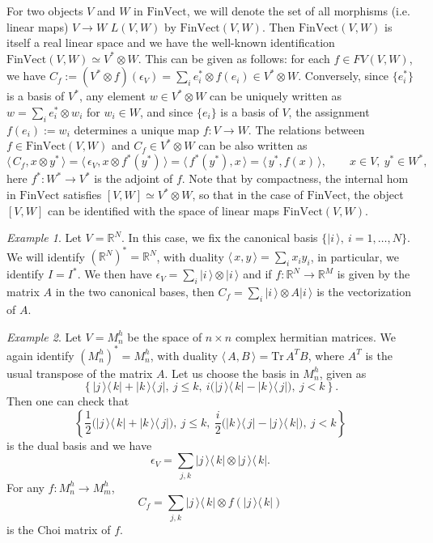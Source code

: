 \documentclass[12pt]{article}
\theoremstyle{definition}
\theoremstyle{remark}
\newtheorem{exm}{Example}
\def \Tr{\mathrm{Tr}\,}
\def\<{\langle\,}
\def\>{\,\rangle}
\def \FV{\mathrm{FinVect}}
\begin{document}
For two objects $V$ and $W$ in $\FV$, we will denote the set of all morphisms (i.e. linear
maps) $V\to
W$ $L(V,W)$  by $\FV(V,W)$. Then $\FV(V,W)$ is itself a real linear space and  we have the well-known identification 
$\FV(V,W)\simeq V^*\otimes W$. This can be given as follows: for each $f\in FV(V,W)$, we have 
$C_f:=(V^*\otimes f)(\epsilon_V)=\sum_i e_i^*\otimes f(e_i)\in V^*\otimes W$. Conversely,
since $\{e_i^*\}$ is a basis of $V^*$, 
any element $w\in V^*\otimes W$ can be uniquely written as $w=\sum_i e_i^*\otimes w_i$ for
$w_i\in W$, and since $\{e_i\}$ is a basis of $V$, the assignment $f(e_i):=w_i$ determines a
unique map $f:V\to W$. The relations between $f\in \FV(V,W)$ and $C_f\in V^*\otimes W$ can
be also written as
\[
\<C_f,x\otimes y^*\>=\<\epsilon_V,x\otimes f^*(y^*)\>=\<f^*(y^*),x\>=\<y^*,f(x)\>,\qquad x\in
V,\ y^*\in W^*,
\]
here $f^*:W^*\to V^*$ is the adjoint of $f$.
Note that by compactness, the internal hom in $\FV$ satisfies $[V,W]\simeq V^*\otimes W$,
so that  in the case of $\FV$, the object $[V,W]$ can be identified with the space of linear
maps $\FV(V,W)$. 


\begin{exm}\label{exm:classical} Let $V=\mathbb R^N$. In this case, we fix the canonical basis $\{|i\>,\
i=1,\dots,N\}$. We will identify $(\mathbb R^N)^*=\mathbb R^N$, with duality
$\<x,y\>=\sum_i x_iy_i$, in particular, we identify $I=I^*$. We then have
$\epsilon_V=\sum_i |i\>\otimes |i\>$ and if $f:\mathbb R^N\to \mathbb R^M$ is given by the
matrix $A$ in the two canonical bases, then  $C_f=\sum_i |i\>\otimes A|i\>$ is the
vectorization of $A$.

\end{exm}


\begin{exm}\label{exm:quantum} Let $V=M_n^h$ be the space of $n\times n$ complex hermitian matrices. We again
identify $(M_n^h)^*=M_n^h$, with duality $\<A,B\>=\Tr A^TB$, where $A^T$ is the usual
transpose of the matrix $A$. Let us choose the basis in $M_n^h$, given as
\[
\left\{|j\>\<k|+|k\>\<j|,\ j\le k,\ i\biggl(|j\>\<k|-|k\>\<j|\biggr),\ j<k\right\}.
\]
Then one can check that
\[
\left\{\frac12\biggl(|j\>\<k|+|k\>\<j|\biggl),\ j\le k,\
\frac{i}{2}\biggl(|k\>\<j|-|j\>\<k|\biggr),\ j<k\right\}
\]
is the dual basis and we have
\[
\epsilon_V=\sum_{j,k} |j\>\<k|\otimes |j\>\<k|.
\]
For any $f:M_n^h\to M_m^h$, 
\[
C_f=\sum_{j,k} |j\>\<k|\otimes f(|j\>\<k|)
\]
is the Choi matrix of $f$.

\end{exm}
\end{document}
